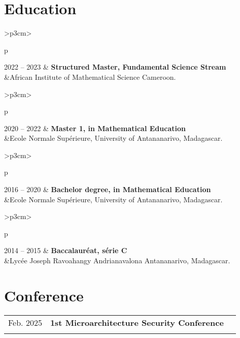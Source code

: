 \documentclass[11pt]{article}
\newcommand{\cvEduc}[3]{\begin{tabular}{>{\raggedleft\arraybackslash}p{3cm}>{\raggedright\arraybackslash}p{\linewidth}}
		#1 & \textbf{#2}  \\
		&#3 \\
\end{tabular}
\vspace*{3pt}}
\newcommand{\cvWP}[4]{\begin{tabular}{>{\raggedleft\arraybackslash}p{3cm}>{\raggedright\arraybackslash}p{13cm}>{\raggedleft\arraybackslash}m{3cm}}%
		#1 & \textbf{#2} & \textbf{#3}  \\%
		&\multicolumn{2}{>{\raggedright\arraybackslash}p{16cm}}{#4} \\%
\end{tabular}}
\begin{document}


\section{Education}
\cvEduc{2022 -- 2023}{Structured Master, Fundamental Science Stream}{African Institute of Mathematical Science Cameroon.}

\cvEduc{2020 -- 2022}{Master 1, in Mathematical Education}{Ecole Normale Supérieure, University of Antananarivo, Madagascar.}

\cvEduc{2016 -- 2020}{Bachelor degree, in Mathematical Education}{Ecole Normale Supérieure, University of Antananarivo, Madagascar.}

\cvEduc{2014 -- 2015}{Baccalauréat, série C}{Lycée Joseph Ravoahangy Andrianavalona Antananarivo, Madagascar.}

\section{Conference}
\cvWP{19 Feb. 2025}{1st Microarchitecture Security Conference}{}{Ruhr University, Bochum, Germany}
\end{document}
